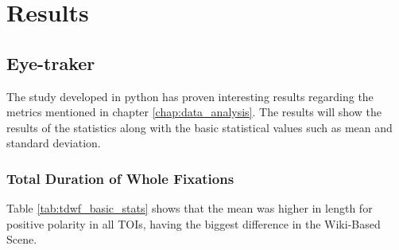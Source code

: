 \chapter{Results}
\label{chap:results}
\section{Eye-traker}
The study developed in python has proven interesting results regarding the 
metrics mentioned in chapter \ref{chap:data_analysis}. The results will show the results of the statistics along with
the basic statistical values such as mean and standard deviation.
\subsection{Total Duration of Whole Fixations}
Table \ref{tab:tdwf_basic_stats} shows that the mean was higher in length for positive polarity in all TOIs,
having the biggest difference in the Wiki-Based Scene.
\begin{table}[H]
    \centering
    \small
    \setlength{\tabcolsep}{4pt}
    \renewcommand{\arraystretch}{1.3}
    \caption{Results of Total Duration of Whole Fixations}
    \label{tab:tdwf_basic_stats}

\end{table}
